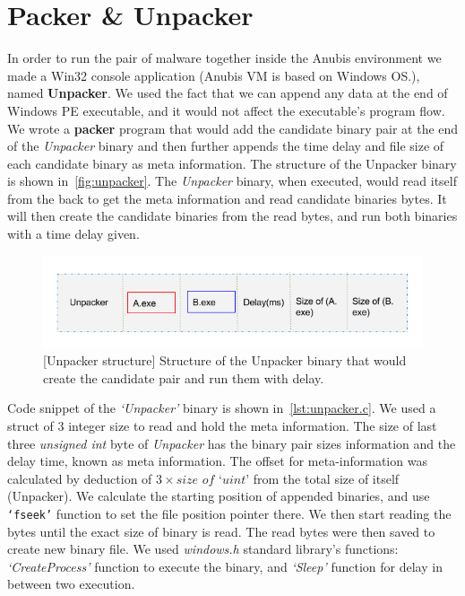 \section{Packer \& Unpacker}
\label{sec:packerunpacker}
In order to run the pair of malware together inside the Anubis environment we made a Win32 console application (Anubis VM is based on Windows OS.\@), named \textbf{Unpacker}.
We used the fact that we can append any data at the end of Windows PE executable, and it would not affect the executable's program flow.
We wrote a \textbf{packer} program that would add the candidate binary pair at the end of the \emph{Unpacker} binary and then further appends the time delay and file size of each candidate binary as meta information.
The structure of the Unpacker binary is shown in~\autoref{fig:unpacker}.
The \emph{Unpacker} binary, when executed, would read itself from the back to get the meta information and read candidate binaries bytes.
It will then create the candidate binaries from the read bytes, and run both binaries with a time delay given.\\
\begin{figure}[htbp]
  \centering
  \includegraphics[scale=0.5]{figures/unpacker.png}
\caption{[Unpacker structure] Structure of the Unpacker binary that would create the candidate pair and run them with delay.}
\label{fig:unpacker}
\end{figure}

Code snippet of the \emph{`Unpacker'} binary is shown in~\autoref{lst:unpacker.c}.
We used a struct of 3 integer size to read and hold the meta information. The size of last three \textit{unsigned int} byte of \emph{Unpacker} has the binary pair sizes information and the delay time, known as meta information.
The offset for meta-information was calculated by deduction of $3 \times \textit{size of `uint'}$ from the total size of itself (Unpacker).
We calculate the starting position of appended binaries, and use \texttt{`fseek\(\)'} function to set the file position pointer there.
We then start reading the bytes until the exact size of binary is read.
The read bytes were then saved to create new binary file.
We used \emph{windows.h} standard library's functions: \emph{`CreateProcess'} function to execute the binary, and \emph{`Sleep'} function for delay in between two execution.\\

